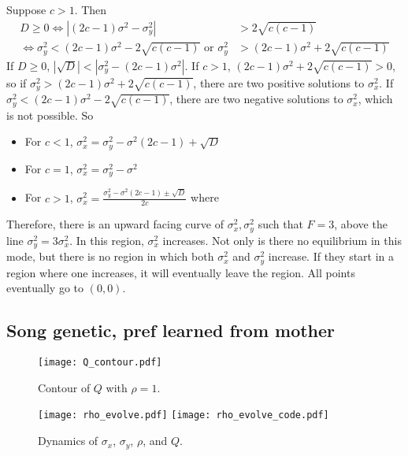 \documentclass{article}
\begin{document}
Suppose $c> 1$. Then 
\begin{align*}
D\geq 0 \Leftrightarrow |(2c-1)\sigma^2-\sigma_y^2|&>2\sqrt{c(c-1)}
\\ \Leftrightarrow \sigma_y^2<(2c-1)\sigma^2-2\sqrt{c(c-1)} \text{ or } \sigma_y^2&>(2c-1)\sigma^2+2\sqrt{c(c-1)}
\end{align*}
If $D\geq 0$, $|\sqrt{D}|<|\sigma_y^2-(2c-1)\sigma^2|$. If $c>1$, $(2c-1)\sigma^2+2\sqrt{c(c-1)}>0$, so if $\sigma_y^2>(2c-1)\sigma^2+2\sqrt{c(c-1)}$,  there are two positive solutions to $\sigma_x^2$. 
If  $\sigma_y^2<(2c-1)\sigma^2-2\sqrt{c(c-1)}$, there are two negative solutions to $\sigma_x^2$, which is not possible. %
So 
\begin{itemize}
\item For $c<1$, $\sigma_x^2=\sigma_y^2-\sigma^2(2c-1)+\sqrt{D}$
\item For $c=1$, $\sigma_x^2=\sigma_y^2-\sigma^2$
\item For $c>1$, $\sigma_x^2=\frac{\sigma_y^2-\sigma^2(2c-1)\pm\sqrt{D}}{2c}$ where
\end{itemize}
Therefore, there is an upward facing curve of $\sigma_x^2,\sigma_y^2$ such that $F=3$, above the line $\sigma_y^2=3\sigma_x^2$. In this region, $\sigma_x^2$ increases. Not only is there no equilibrium in this mode, but there is no region in which both $\sigma_x^2$ and $\sigma_y^2$ increase. If they start in a region where one increases, it will eventually leave the region. All points eventually go to $(0,0)$.

\subsection{Song genetic, pref learned from mother }


\begin{figure}
\texttt{[image: Q\_contour.pdf]}
\caption{\label{Q_contour} Contour of $Q$ with $\rho=1$.}
\end{figure}

\begin{figure}
\texttt{[image: rho\_evolve.pdf]}
\texttt{[image: rho\_evolve\_code.pdf]}
\caption{\label{rho_evolve} Dynamics of $\sigma_x$, $\sigma_y$, $\rho$, and $Q$. }
\end{figure}
\end{document}
